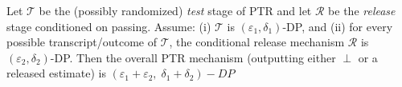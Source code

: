 Let $\mathcal{T}$ be the (possibly randomized) \emph{test} stage of PTR and let $\mathcal{R}$ be the \emph{release} stage conditioned on passing. Assume: (i) $\mathcal{T}$ is $(\varepsilon_1,\delta_1)$-DP, and (ii) for every possible transcript/outcome of $\mathcal{T}$, the conditional release mechanism $\mathcal{R}$ is $(\varepsilon_2,\delta_2)$-DP. Then the overall PTR mechanism (outputting either $\perp$ or a released estimate) is $(\varepsilon_1+\varepsilon_2,\;\delta_1+\delta_2)-DP$